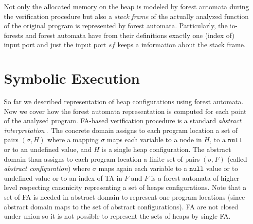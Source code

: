 Not only the allocated memory on the heap is modeled by forest automata during the verification procedure but also
a \emph{stack frame} of the actually analyzed function of the original program is represented by forest automata.
Particularly, the io-forests and forest automata have from their definitions exactly one (index of) input port and
just the input port $sf$ keeps a information about the stack frame.

\section{Symbolic Execution}
\label{sec:se}

So far we described representation of heap configurations using forest automata.
Now we cover how the forest automata representation is computed for each point of the analysed program.
FA-based verification procedure is a standard \emph{abstract interpretation} \cite{cousot:77}.
The concrete domain assigns to each program location a set of pairs
$(\sigma,H)$ where a mapping $\sigma$ maps each variable
to a node in $H$, to a $\texttt{null}$ or to an undefined value, and $H$ is a single heap configuration.
The abstract domain than assigns to each program location a finite set of pairs
$(\sigma, F)$ (called \emph{abstract configuration}) where $\sigma$ maps again each variable to a
$\texttt{null}$ value or to undefined value or to an index of TA in $F$ and $F$ is a forest automata
of higher level respecting canonicity representing a set of heaps configurations.
Note that a set of FA is needed in abstract domain to represent one program locations (since
abstract domain maps to the set of abstract configurations).
FA are not closed under union so it is not possible to represent the sets of heaps by single FA.

